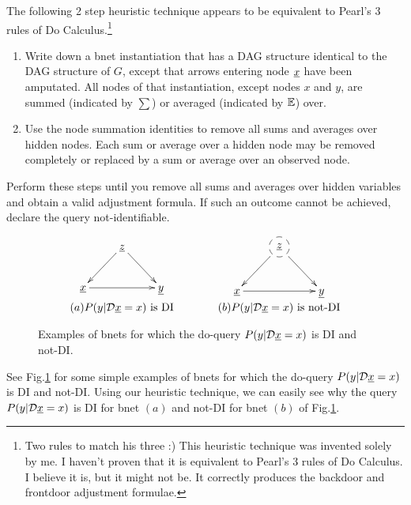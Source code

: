 The following 2 step heuristic technique appears to be equivalent to Pearl's 3 rules of Do Calculus.\footnote{Two rules to match his three :)  This heuristic technique was invented solely by me. I haven't proven that it is equivalent to Pearl's 
3 rules of Do Calculus. I believe it is,
but it might not be. It 
correctly produces the backdoor and frontdoor adjustment formulae.}

\begin{mdframed}[hidealllines=true,backgroundcolor=blue!10]

\begin{enumerate}
\item 
Write down a bnet instantiation
that has a DAG structure identical
to the DAG structure of $G$,
except that arrows entering node
$\rvx$ have been amputated.
All nodes  of that instantiation, except
nodes  $x$ and $y$,
are summed (indicated by $\sum$) or averaged
(indicated by ${ \mathbb{E}}$) over.



\item Use the node summation identities to
remove all sums and averages over hidden nodes.
Each sum or average over a hidden node may be 
removed completely or replaced by a sum or average over an observed node. 
\end{enumerate}
Perform these steps until you remove all sums and averages  over hidden variables 
and obtain a valid adjustment formula.
If such an outcome cannot be achieved,
declare the  query not-identifiable.

\end{mdframed}


\begin{figure}[h!]
$$
\begin{array}{ccc}
\xymatrix{
&\rvz\ar[ld]\ar[rd]
\\
\rvx\ar[rr]&&\rvy
}
&\quad\quad&
\xymatrix{
&*++[F-o]{\rvz}\ar[ld]\ar[rd]
\\
\rvx\ar[rr]&&\rvy
}
\\
(a) \text{$P(y|\cald\rvx=x)$ is DI}
&&(b) \text{$P(y|\cald\rvx=x)$ is not-DI}
\end{array}
$$
\caption{Examples of
bnets for which
the do-query $P(y|\cald\rvx=x)$
is
DI
and not-DI.
}
\label{fig-iden-noniden}
\end{figure}
See Fig.\ref{fig-iden-noniden}
for some simple
examples of
bnets for which
the do-query $P(y|\cald\rvx=x)$
is
DI
and not-DI.
Using our heuristic technique,
we can easily see why the
query $P(y|\cald\rvx=x)$
is DI
for bnet $(a)$ 
and not-DI for bnet $(b)$
of Fig.\ref{fig-iden-noniden}.

